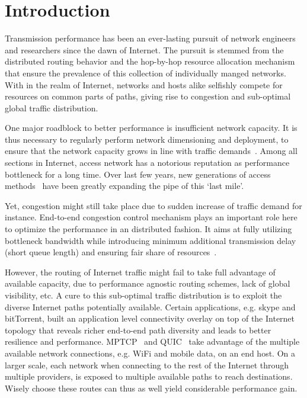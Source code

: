 \chapter{Introduction}
\label{sec:intro}

Transmission performance has been an ever-lasting pursuit of network engineers and researchers since the dawn of Internet. 
The pursuit is stemmed from the distributed routing behavior and the hop-by-hop resource allocation mechanism that ensure the prevalence of this collection of individually manged networks.
With in the realm of Internet, networks and hosts alike selfishly compete for resources on common parts of paths, giving rise to congestion and sub-optimal global traffic distribution.

One major roadblock to better performance is insufficient network capacity. It is thus necessary to regularly perform network dimensioning and deployment, to ensure that the network capacity grows in line with traffic demands~\cite{pioro2004routing}. 
Among all sections in Internet, access network has a notorious reputation as performance bottleneck for a long time. 
Over last few years, new generations of access methods~\cite{Kramer2002, kazovsky2007next} have been greatly expanding the pipe of this `last mile'. 

Yet, congestion might still take place due to sudden increase of traffic demand for instance. End-to-end congestion control mechanism plays an important role here to optimize the performance in an distributed fashion.  
It aims at fully utilizing bottleneck bandwidth while introducing minimum additional transmission delay (short queue length) and ensuring fair share of resources~\cite{Jacobson1988, mathis1997macroscopic, Cardwell2016}.

However, the routing of Internet traffic might fail to take full advantage of available capacity, due to performance agnostic routing schemes, lack of global visibility, etc.
A cure to this sub-optimal traffic distribution is to exploit the diverse Internet paths potentially available.
Certain applications, e.g. skype and bitTorrent, built an application level connectivity overlay on top of the Internet topology that reveals richer end-to-end path diversity and leads to better resilience and performance.
MPTCP~\cite{Han2006} and QUIC~\cite{roskind2012quick} take advantage of the multiple available network connections, e.g. WiFi and mobile data, on an end host.
On a larger scale, each network when connecting to the rest of the Internet through multiple providers, is exposed to multiple available paths to reach destinations. Wisely choose these routes can thus as well yield considerable performance gain.


